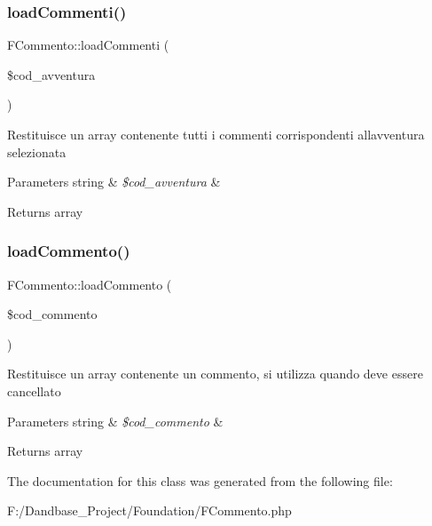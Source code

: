 \subsubsection{\texorpdfstring{load\+Commenti()}{loadCommenti()}}
{\footnotesize\ttfamily F\+Commento\+::load\+Commenti (\begin{DoxyParamCaption}\item[{}]{\$cod\+\_\+avventura }\end{DoxyParamCaption})}

Restituisce un array contenente tutti i commenti corrispondenti all\textquotesingle{}avventura selezionata


\begin{DoxyParams}[1]{Parameters}
string & {\em \$cod\+\_\+avventura} & \\
\hline
\end{DoxyParams}
\begin{DoxyReturn}{Returns}
array 
\end{DoxyReturn}
\mbox{\label{class_f_commento_a575ec007020823deec1607b1acdc6d82}} 
\subsubsection{\texorpdfstring{load\+Commento()}{loadCommento()}}
{\footnotesize\ttfamily F\+Commento\+::load\+Commento (\begin{DoxyParamCaption}\item[{}]{\$cod\+\_\+commento }\end{DoxyParamCaption})}

Restituisce un array contenente un commento, si utilizza quando deve essere cancellato


\begin{DoxyParams}[1]{Parameters}
string & {\em \$cod\+\_\+commento} & \\
\hline
\end{DoxyParams}
\begin{DoxyReturn}{Returns}
array 
\end{DoxyReturn}


The documentation for this class was generated from the following file\+:\begin{DoxyCompactItemize}
\item 
F\+:/\+Dandbase\+\_\+\+Project/\+Foundation/F\+Commento.\+php\end{DoxyCompactItemize}
